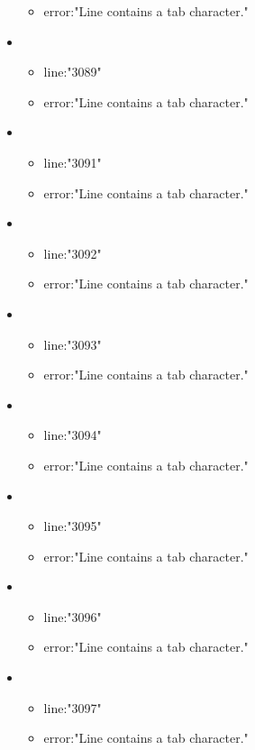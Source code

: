 \begin{itemize}
\begin{itemize}
		\item error:"Line contains a tab character." 
	\end{itemize}
	\item 
	\begin{itemize} 
		\item line:"3089" 
		\item error:"Line contains a tab character." 
	\end{itemize}
	\item 
	\begin{itemize} 
		\item line:"3091" 
		\item error:"Line contains a tab character." 
	\end{itemize}
	\item 
	\begin{itemize} 
		\item line:"3092" 
		\item error:"Line contains a tab character." 
	\end{itemize}
	\item 
	\begin{itemize} 
		\item line:"3093" 
		\item error:"Line contains a tab character." 
	\end{itemize}
	\item 
	\begin{itemize} 
		\item line:"3094" 
		\item error:"Line contains a tab character." 
	\end{itemize}
	\item 
	\begin{itemize} 
		\item line:"3095" 
		\item error:"Line contains a tab character." 
	\end{itemize}
	\item 
	\begin{itemize} 
		\item line:"3096" 
		\item error:"Line contains a tab character." 
	\end{itemize}
	\item 
	\begin{itemize} 
		\item line:"3097" 
		\item error:"Line contains a tab character." 
	\end{itemize}

\end{itemize}
